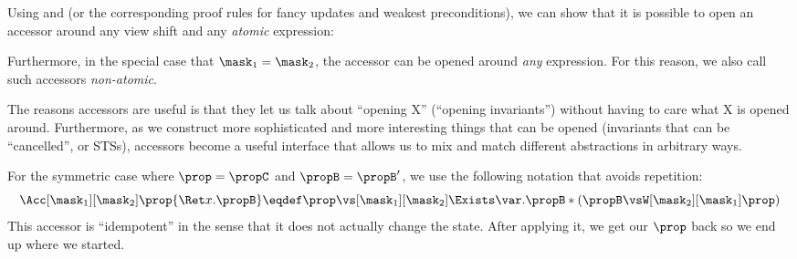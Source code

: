 Using  and  (or the corresponding proof rules for fancy updates and weakest preconditions), we can show that it is possible to open an accessor around any view shift and any \emph{atomic} expression:

Furthermore, in the special case that $\mask_1 = \mask_2$, the accessor can be opened around \emph{any} expression.
For this reason, we also call such accessors \emph{non-atomic}.

The reasons accessors are useful is that they let us talk about ``opening X'' (\eg ``opening invariants'') without having to care what X is opened around.
Furthermore, as we construct more sophisticated and more interesting things that can be opened (\eg invariants that can be ``cancelled'', or STSs), accessors become a useful interface that allows us to mix and match different abstractions in arbitrary ways.

For the symmetric case where $\prop = \propC$ and $\propB = \propB'$, we use the following notation that avoids repetition:
\[ \Acc[\mask_1][\mask_2]\prop{\Ret x. \propB} \eqdef \prop \vs[\mask_1][\mask_2] \Exists\var. \propB * (\propB \vsW[\mask_2][\mask_1] \prop)  \]
This accessor is ``idempotent'' in the sense that it does not actually change the state.  After applying it, we get our $\prop$ back so we end up where we started.

